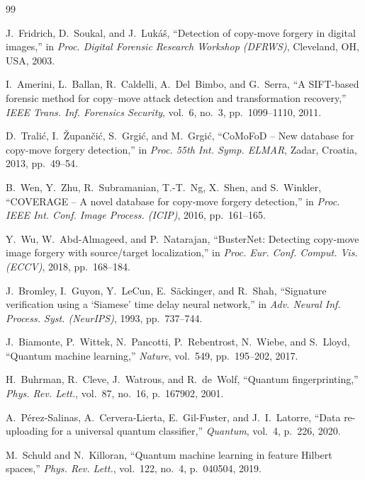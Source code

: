 \documentclass[conference]{IEEEtran}
\begin{document}
\begin{thebibliography}{99}

J.~Fridrich, D.~Soukal, and J.~Luk\'a\v{s}, ``Detection of copy-move forgery in digital images,'' in \emph{Proc. Digital Forensic Research Workshop (DFRWS)}, Cleveland, OH, USA, 2003.

I.~Amerini, L.~Ballan, R.~Caldelli, A.~Del~Bimbo, and G.~Serra, ``A SIFT-based forensic method for copy--move attack detection and transformation recovery,'' \emph{IEEE Trans. Inf. Forensics Security}, vol.~6, no.~3, pp.~1099--1110, 2011.

D.~Trali\'c, I.~\v{Z}upan\v{c}i\'c, S.~Grgi\'c, and M.~Grgi\'c, ``CoMoFoD -- New database for copy-move forgery detection,'' in \emph{Proc. 55th Int. Symp. ELMAR}, Zadar, Croatia, 2013, pp.~49--54.

B.~Wen, Y.~Zhu, R.~Subramanian, T.-T.~Ng, X.~Shen, and S.~Winkler, ``COVERAGE -- A novel database for copy-move forgery detection,'' in \emph{Proc. IEEE Int. Conf. Image Process. (ICIP)}, 2016, pp.~161--165.

Y.~Wu, W.~Abd-Almageed, and P.~Natarajan, ``BusterNet: Detecting copy-move image forgery with source/target localization,'' in \emph{Proc. Eur. Conf. Comput. Vis. (ECCV)}, 2018, pp.~168--184.

J.~Bromley, I.~Guyon, Y.~LeCun, E.~S\"ackinger, and R.~Shah, ``Signature verification using a `Siamese' time delay neural network,'' in \emph{Adv. Neural Inf. Process. Syst. (NeurIPS)}, 1993, pp.~737--744.

J.~Biamonte, P.~Wittek, N.~Pancotti, P.~Rebentrost, N.~Wiebe, and S.~Lloyd, ``Quantum machine learning,'' \emph{Nature}, vol.~549, pp.~195--202, 2017.

H.~Buhrman, R.~Cleve, J.~Watrous, and R.~de~Wolf, ``Quantum fingerprinting,'' \emph{Phys. Rev. Lett.}, vol.~87, no.~16, p.~167902, 2001.

A.~P\'erez-Salinas, A.~Cervera-Lierta, E.~Gil-Fuster, and J.~I.~Latorre, ``Data re-uploading for a universal quantum classifier,'' \emph{Quantum}, vol.~4, p.~226, 2020.

M.~Schuld and N.~Killoran, ``Quantum machine learning in feature Hilbert spaces,'' \emph{Phys. Rev. Lett.}, vol.~122, no.~4, p.~040504, 2019.


\end{thebibliography}
\end{document}

